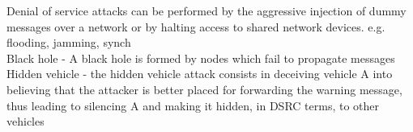 Denial of service attacks can be performed by the aggressive injection of dummy messages over a network or by halting access to shared network devices. e.g. flooding, jamming, synch \cite{biswas2012ddos}\\



Black hole -  A black hole is formed by nodes which fail to propagate messages \cite{laurendeau2006threats} \\


Hidden vehicle - the hidden vehicle attack consists in deceiving vehicle A into believing that the attacker is better placed for forwarding the warning message, thus leading to silencing A and making it hidden, in DSRC terms, to other vehicles \cite{raya2007securing}\\
